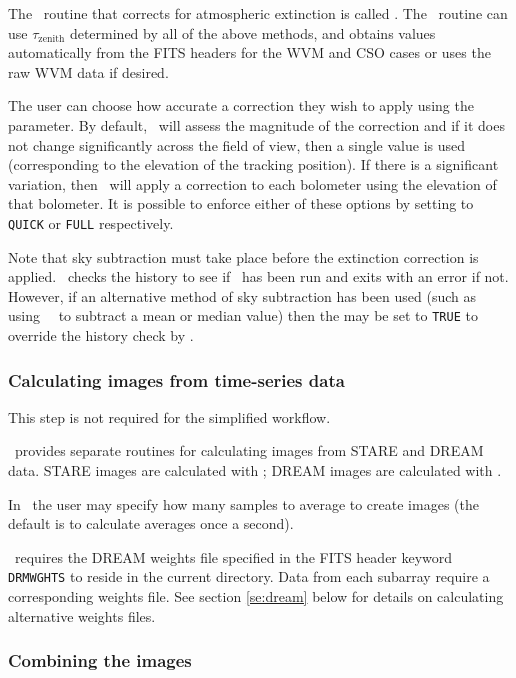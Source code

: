 \documentclass[oneside,11pt]{starlink}
\begin{document}
The \SMURF\ routine that corrects for atmospheric extinction is called
\extinction. The \extinction\ routine can use $\tau_{\textrm{zenith}}$
determined by all of the above methods, and obtains values
automatically from the FITS headers for the WVM and CSO cases or uses
the raw WVM data if desired.

The user can choose how accurate a correction they wish to apply using
the  parameter. By default, \extinction\ will assess
the magnitude of the correction and if it does not change
significantly across the field of view, then a single value is used
(corresponding to the elevation of the tracking position). If there is
a significant variation, then \extinction\ will apply a correction to
each bolometer using the elevation of that bolometer. It is possible
to enforce either of these options by setting  to
\texttt{QUICK} or \texttt{FULL} respectively.

Note that sky subtraction must take place before the extinction
correction is applied. \extinction\ checks the history to see if
\remsky\ has been run and exits with an error if not. However, if an
alternative method of sky subtraction has been used (such as using
\KAPPA\ \csub\ to subtract a mean or median value) then the
 may be set to \texttt{TRUE} to override the history
check by \extinction.

\subsubsection{Calculating images from time-series
  data\label{se:dsimages}}

This step is not required for the simplified workflow.

\SMURF\ provides separate routines for calculating images from STARE
and DREAM data. STARE images are calculated with \starecalc; DREAM
images are calculated with \dreamsolve.

In \starecalc\ the user may specify how many samples to average to
create images (the default is to calculate averages once a second).

\dreamsolve\ requires the DREAM weights file specified in the FITS
header keyword \texttt{DRMWGHTS} to reside in the current
directory. Data from each subarray require a corresponding weights
file. See section \ref{se:dream} below for details on calculating
alternative weights files.

\subsubsection{Combining the images\label{se:mosaic}}
\end{document}
